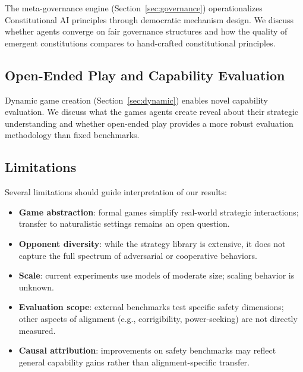 The meta-governance engine (Section~\ref{sec:governance}) operationalizes
Constitutional AI principles through democratic mechanism design. We discuss
whether agents converge on fair governance structures and how the quality of
emergent constitutions compares to hand-crafted constitutional principles.

\subsection{Open-Ended Play and Capability Evaluation}
\label{sec:openended-discussion}


Dynamic game creation (Section~\ref{sec:dynamic}) enables novel capability
evaluation. We discuss what the games agents create reveal about their
strategic understanding and whether open-ended play provides a more robust
evaluation methodology than fixed benchmarks.

\subsection{Limitations}
\label{sec:limitations}

Several limitations should guide interpretation of our results:

\begin{itemize}[nosep]
    \item \textbf{Game abstraction}: formal games simplify real-world
          strategic interactions; transfer to naturalistic settings
          remains an open question.
    \item \textbf{Opponent diversity}: while the strategy library is
          extensive, it does not capture the full spectrum of adversarial
          or cooperative behaviors.
    \item \textbf{Scale}: current experiments use models of moderate size;
          scaling behavior is unknown.
    \item \textbf{Evaluation scope}: external benchmarks test specific
          safety dimensions; other aspects of alignment (e.g., corrigibility,
          power-seeking) are not directly measured.
    \item \textbf{Causal attribution}: improvements on safety benchmarks
          may reflect general capability gains rather than alignment-specific
          transfer.
\end{itemize}

